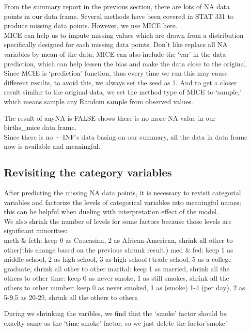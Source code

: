 \documentclass[]{article}
\begin{document}
From the summary report in the previous section, there are lots of NA
data points in our data frame. Several methods have been covered in STAT
331 to produce missing data points. However, we use MICE here.\\
MICE can help us to impute missing values which are drawn from a
distribution specifically designed for each missing data points. Don't
like replace all NA variables by mean of the data; MICE can also include
the `var' in the data prediction, which can help lessen the bias and
make the data close to the original.\\
Since MCIE is `prediction' function, thus every time we run this may
cause different results, to avoid this, we always set the seed as 1. And
to get a closer result similar to the original data, we set the method
type of MICE to `sample,' which means sample any Random sample from
observed values.

The result of anyNA is FALSE shows there is no more NA value in our
births\_mice data frame.\\
Since there is no +-INF's data basing on our summary, all the data in
data frame now is available and meaningful.\\
\subsection{Revisiting the category variables}

After predicting the missing NA data points, it is necessary to revisit
categorial variables and factorize the levels of categorical variables
into meaningful names; this can be helpful when dueling with
interpretation effect of the model.\\
We also shrink the number of levels for some factors because those
levels are significant minorities:\\
meth \& feth: keep 0 as Caucasian, 2 as African-American, shrink all
other to other(this change based on the previous shrunk result.) med \&
fed: keep 1 as middle school, 2 as high school, 3 as high school+trade
school, 5 as a college graduate, shrink all other to other marital: keep
1 as married, shrink all the others to other time: keep 0 as never
smoke, 1 as still smokes, shrink all the others to other number: keep 0
as never smoked, 1 as (smoke) 1-4 (per day), 2 as 5-9,5 as 20-29, shrink
all the others to othera

During we shrinking the varibles, we find that the `smoke' factor should
be exaclty same as the `time smoke' factor, so we just delete the
factor'smoke'
\end{document}
